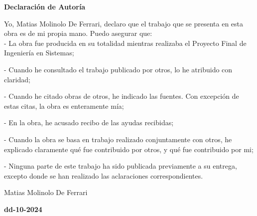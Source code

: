 {\huge\bfseries \space Declaración de Autoría}

\thispagestyle{empty}


\bigskip
\bigskip
Yo, Matias Molinolo De Ferrari, declaro que el trabajo que se presenta en esta obra es de mi propia mano. 
Puedo asegurar que:
\\

- La obra fue producida en su totalidad mientras realizaba el Proyecto Final de Ingeniería en Sistemas;


- Cuando he consultado el trabajo publicado por otros, lo he atribuido con claridad;


- Cuando he citado obras de otros, he indicado las fuentes. Con excepción de estas citas, la obra es enteramente mía;


- En la obra, he acusado recibo de las ayudas recibidas;


- Cuando la obra se basa en trabajo realizado conjuntamente con otros, he explicado claramente qué fue contribuido por otros, y qué fue contribuido por mi;


- Ninguna parte de este trabajo ha sido publicada previamente a su entrega, excepto donde se han realizado las aclaraciones correspondientes.

\bigskip
\begin{center}
\bigskip\bigskip\bigskip\bigskip\bigskip\bigskip\bigskip\bigskip
Matias Molinolo De Ferrari
\end{center}


\vspace*{\fill}

\begin{center}
\textbf{dd-10-2024}%
\end{center}
\newpage